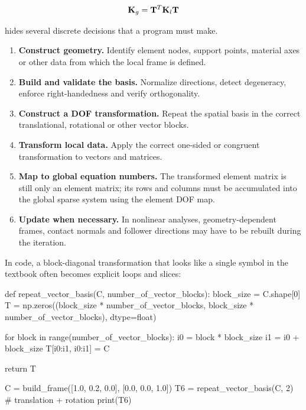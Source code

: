 \begin{equation}
    \mathbf{K}_g=\mathbf{T}^{T}\mathbf{K}_l\mathbf{T}
\end{equation}

hides several discrete decisions that a program must make.

\begin{enumerate}
    \item \textbf{Construct geometry.} Identify element nodes, support points,
    material axes or other data from which the local frame is defined.

    \item \textbf{Build and validate the basis.} Normalize directions, detect
    degeneracy, enforce right-handedness and verify orthogonality.

    \item \textbf{Construct a DOF transformation.} Repeat the spatial basis in
    the correct translational, rotational or other vector blocks.

    \item \textbf{Transform local data.} Apply the correct one-sided or congruent
    transformation to vectors and matrices.

    \item \textbf{Map to global equation numbers.} The transformed element matrix
    is still only an element matrix; its rows and columns must be accumulated into
    the global sparse system using the element DOF map.

    \item \textbf{Update when necessary.} In nonlinear analyses, geometry-dependent
    frames, contact normals and follower directions may have to be rebuilt during
    the iteration.
\end{enumerate}

In code, a block-diagonal transformation that looks like a single symbol in the
textbook often becomes explicit loops and slices:

\begin{python}
def repeat_vector_basis(C, number_of_vector_blocks):
    block_size = C.shape[0]
    T = np.zeros((block_size * number_of_vector_blocks,
                  block_size * number_of_vector_blocks), dtype=float)

    for block in range(number_of_vector_blocks):
        i0 = block * block_size
        i1 = i0 + block_size
        T[i0:i1, i0:i1] = C

    return T


C = build_frame([1.0, 0.2, 0.0], [0.0, 0.0, 1.0])
T6 = repeat_vector_basis(C, 2)  # translation + rotation
print(T6)
\end{python}

